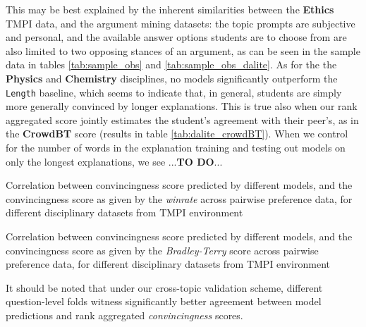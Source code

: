 \documentclass[notitlepage,12pt]{jedm}
\begin{document}
This may be best explained by the inherent similarities between the 
\textbf{Ethics} TMPI data, and the argument mining datasets: the topic prompts 
are subjective and personal, and the available answer options students are to 
choose from are also limited to two opposing stances of an argument, as can be 
seen in the sample data in tables \ref{tab:sample_obs} and 
\ref{tab:sample_obs_dalite}. 
As for the the \textbf{Physics} and \textbf{Chemistry} disciplines, no models 
significantly outperform the \verb|Length| baseline, which seems to indicate 
that, in general, students are simply more generally convinced by longer 
explanations.
This is true also when our rank aggregated score jointly estimates the 
student's agreement with their peer's, as in the \textbf{CrowdBT} score 
(results in table \ref{tab:dalite_crowdBT}).
When we control for the number of words in the explanation training and testing 
out models on only the longest explanations, we see ...\textbf{TO DO}...

\begin{table}
	\parbox{.45\linewidth}{
		\centering
	
	}
	\hfill
	\parbox{.45\linewidth}{
		\centering
	
	}
	\caption{Correlation between convincingness score predicted by 
		different models, and the convincingness score as given by the 
		\textit{winrate} across pairwise preference data, for different 
		disciplinary datasets from TMPI environment
	}
	\label{tab:dalite_winrate}
\end{table}


\begin{table}
	\parbox{.45\linewidth}{
		\centering
		
	}
	\hfill
	\parbox{.45\linewidth}{
		\centering
		
	}
	\caption{Correlation between convincingness score predicted by 
		different models, and the convincingness score as given by the 
		\textit{Bradley-Terry} score across pairwise preference data, for 
		different disciplinary datasets from TMPI environment
	}
	\label{tab:dalite_BT}
\end{table}

It should be noted that under our cross-topic validation scheme, different 
question-level folds witness significantly better agreement between model 
predictions and rank aggregated \textit{convincingness} scores.
\end{document}
